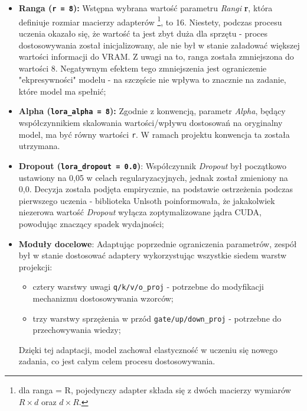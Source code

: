 \documentclass[12pt,a4paper]{article}
\begin{document}
\begin{itemize}

    \item \textbf{Ranga (\texttt{r = 8}):} Wstępna wybrana wartość parametru \emph{Rangi} \textbf{r}, która definiuje rozmiar macierzy adapterów
            \footnote{dla ranga = R, pojedynczy adapter składa się z dwóch macierzy wymiarów $R \times d$ oraz $d \times R$.}, to 16.
            Niestety, podczas procesu uczenia okazało się, że wartość ta jest zbyt duża dla sprzętu - proces dostosowywania został inicjalizowany, ale nie był 
            w stanie załadować większej wartości informacji do VRAM. Z uwagi na to, ranga została zmniejszona do wartości 8.
            Negatywnym efektem tego zmniejszenia jest ograniczenie "ekpresywności" modelu - na szczęście nie wpływa to znacznie na zadanie, które model ma spełnić; 
    
    \item \textbf{Alpha (\texttt{lora\_alpha = 8}):} Zgodnie z konwencją, parametr \emph{Alpha}, będący współczynnikiem skalowania wartości/wpływu dostosowań na oryginalny model, 
            ma być równy wartości \texttt{r}. W ramach projektu konwencja ta została utrzymana.

    \item \textbf{Dropout (\texttt{lora\_dropout = 0.0})}: Współczynnik \emph{Dropout} był początkowo ustawiony na 0{,}05 w celach regularyzacyjnych, 
            jednak został zmieniony na 0{,}0. Decyzja została podjęta empirycznie, na podstawie ostrzeżenia podczas pierwszego uczenia - biblioteka Unlsoth poinformowała, 
            że jakakolwiek niezerowa wartość \emph{Dropout} wyłącza zoptymalizowane jądra CUDA, powodując znaczący spadek wydajności;

    \item \textbf{Moduły docelowe}: Adaptując poprzednie ograniczenia parametrów, zespół był w stanie dostosować adaptery wykorzystując wszystkie siedem warstw projekcji:
        \begin{itemize}
            \item cztery warstwy uwagi \texttt{q/k/v/o\_proj} - potrzebne do modyfikacji mechanizmu dostosowywania wzorców;
            \item trzy warstwy sprzężenia w przód \texttt{gate/up/down\_proj} - potrzebne do przechowywania wiedzy;
        \end{itemize}
        Dzięki tej adaptacji, model zachował elastyczność w uczeniu się nowego zadania, co jest całym celem procesu dostosowywania.


\end{itemize}
\end{document}
